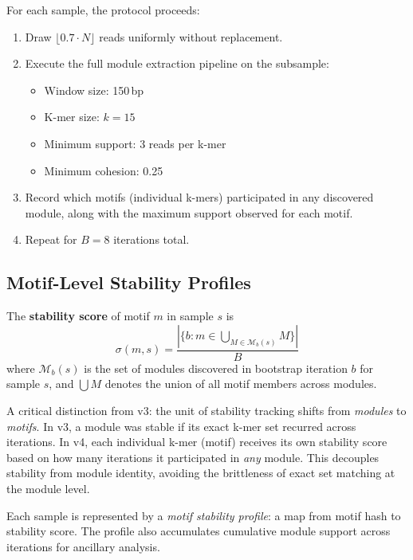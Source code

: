 \documentclass{../yalumba}
\begin{document}
For each sample, the protocol proceeds:

\begin{enumerate}
  \item Draw $\lfloor 0.7 \cdot N \rfloor$ reads uniformly without replacement.
  \item Execute the full module extraction pipeline on the subsample:
    \begin{itemize}
      \item Window size: 150\,bp
      \item K-mer size: $k = 15$
      \item Minimum support: 3 reads per k-mer
      \item Minimum cohesion: 0.25
    \end{itemize}
  \item Record which motifs (individual k-mers) participated in any discovered
    module, along with the maximum support observed for each motif.
  \item Repeat for $B = 8$ iterations total.
\end{enumerate}

\subsection{Motif-Level Stability Profiles}

\begin{definition}
The \textbf{stability score} of motif $m$ in sample $s$ is
\[
  \sigma(m, s) = \frac{|\{b : m \in \bigcup_{M \in \mathcal{M}_b(s)} M\}|}{B}
\]
where $\mathcal{M}_b(s)$ is the set of modules discovered in bootstrap iteration
$b$ for sample $s$, and $\bigcup M$ denotes the union of all motif members
across modules.
\end{definition}


A critical distinction from v3: the unit of stability tracking shifts from
\emph{modules} to \emph{motifs}.  In v3, a module was stable if its exact
k-mer set recurred across iterations.  In v4, each individual k-mer (motif)
receives its own stability score based on how many iterations it participated
in \emph{any} module.  This decouples stability from module identity, avoiding
the brittleness of exact set matching at the module level.

Each sample is represented by a \emph{motif stability profile}: a map from
motif hash to stability score.  The profile also accumulates cumulative module
support across iterations for ancillary analysis.
\end{document}
